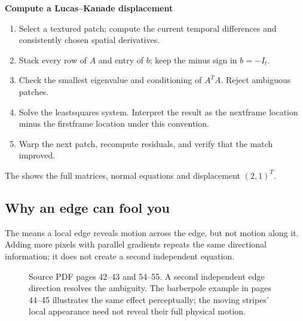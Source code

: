 \documentclass[letterpaper,11pt,english,openany,oneside]{jupyterBook}
\begin{document}
\begin{TextbookBox}
\textbf{Compute a Lucas–Kanade displacement}\par\smallskip
\begin{enumerate}
%
\item {}
\sphinxAtStartPar
Select a textured patch; compute the current temporal differences and consistently chosen spatial derivatives.

\item {}
\sphinxAtStartPar
Stack every row of \(A\) and entry of \(b\); keep the minus sign in \(b=-I_t\).

\item {}
\sphinxAtStartPar
Check the smallest eigenvalue and conditioning of \(A^TA\). Reject ambiguous patches.

\item {}
\sphinxAtStartPar
Solve the least\sphinxhyphen{}squares system. Interpret the result as the next\sphinxhyphen{}frame location minus the first\sphinxhyphen{}frame location under this convention.

\item {}
\sphinxAtStartPar
Warp the next patch, recompute residuals, and verify that the match improved.

\end{enumerate}

\sphinxAtStartPar
The {\hyperref[\detokenize{lectures/lecture05/quiz-workbook:quiz-a3-q1}]{}} shows the full matrices, normal equations and displacement \((2,1)^T\).

\end{TextbookBox}


\subsection{Why an edge can fool you}
\label{\detokenize{lectures/lecture05/tracking:why-an-edge-can-fool-you}}
\sphinxAtStartPar
The  means a local edge reveals motion across the edge, but not motion along it. Adding more pixels with parallel gradients repeats the same directional information; it does not create a second independent equation.

\begin{figure}[H]
\centering
\capstart

\noindent{}
\caption{Source PDF pages 42–43 and 54–55. A second independent edge direction resolves the ambiguity. The barber\sphinxhyphen{}pole example in pages 44–45 illustrates the same effect perceptually; the moving stripes’ local appearance need not reveal their full physical motion.}\label{\detokenize{lectures/lecture05/tracking:fig-lec05-aperture}}\end{figure}
\end{document}
